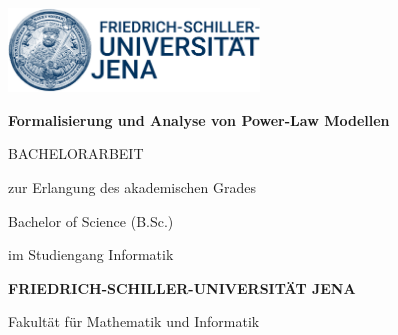 



% 

\begin{titlepage}
    \centering %

    \includegraphics[width=0.5\textwidth]{chapters/titlepage/Logoversionen_UniJena/Bild-Wort-Marke/23cm/png/Bildmarke_blue_23cm.png}\\[2cm]

    {\Huge \bfseries Formalisierung und Analyse von Power-Law Modellen\par}
    \vspace{1.5cm} %

    {\LARGE BACHELORARBEIT\par}
    \vspace{1.5cm}

    {zur Erlangung des akademischen Grades\par}
    {Bachelor of Science (B.Sc.)\par}
    \vspace{1cm}

    {\large im Studiengang Informatik\par} %
    \vfill %

    {\Large \bfseries FRIEDRICH-SCHILLER-UNIVERSITÄT JENA\par}
    {\large Fakultät für Mathematik und Informatik\par}
    \vspace{1cm}


\end{titlepage}

